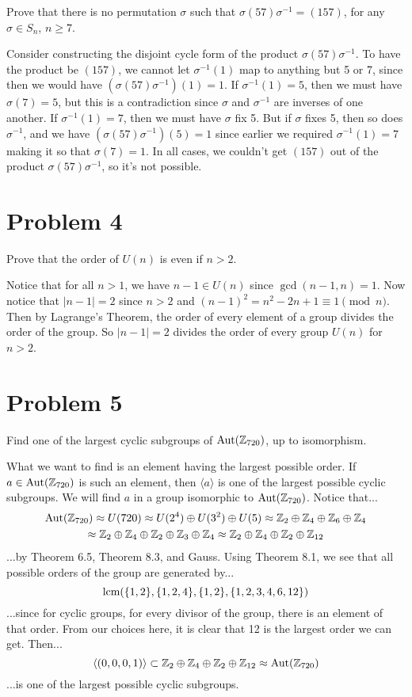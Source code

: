 \documentclass{article}
\begin{document}
Prove that there is no permutation $\sigma$ such that
$\sigma(57)\sigma^{-1}=(157)$, for any $\sigma\in S_n$, $n\geq 7$.

Consider constructing the disjoint cycle form of the product $\sigma(57)\sigma^{-1}$.
To have the product be $(157)$, we cannot let $\sigma^{-1}(1)$ map to anything but
5 or 7, since then we would have $(\sigma(57)\sigma^{-1})(1)=1$.  If $\sigma^{-1}(1)=5$,
then we must have $\sigma(7)=5$, but this is a contradiction since $\sigma$ and
$\sigma^{-1}$ are inverses of one another.  If $\sigma^{-1}(1)=7$, then we
must have $\sigma$ fix 5.  But if $\sigma$ fixes 5, then so does $\sigma^{-1}$,
and we have $(\sigma(57)\sigma^{-1})(5)=1$ since earlier we required $\sigma^{-1}(1)=7$
making it so that $\sigma(7)=1$.  In all cases, we couldn't get $(157)$ out of the
product $\sigma(57)\sigma^{-1}$, so it's not possible.

\section*{Problem 4}

Prove that the order of $U(n)$ is even if $n>2$.

Notice that for all $n>1$, we have $n-1\in U(n)$ since $\gcd(n-1,n)=1$.
Now notice that $|n-1|=2$ since $n>2$ and $(n-1)^2=n^2-2n+1\equiv 1\pmod{n}$.
Then by Lagrange's Theorem, the order of every element of a group divides
the order of the group.  So $|n-1|=2$ divides the order of every group $U(n)$ for $n>2$.

\pagebreak
\section*{Problem 5}

Find one of the largest cyclic subgroups of $\mbox{Aut}(\mathbb{Z}_{720})$, up to isomorphism.

What we want to find is an element having the largest possible order.
If $a\in\mbox{Aut}(\mathbb{Z}_{720})$ is such an element, then $\langle a\rangle$
is one of the largest possible cyclic subgroups.  We will find $a$ in a group
isomorphic to $\mbox{Aut}(\mathbb{Z}_{720})$.  Notice that...
\begin{multline*}
\mbox{Aut}(\mathbb{Z}_{720})\approx U(720)\approx U(2^4)\oplus U(3^2)\oplus U(5)\approx
\mathbb{Z}_2\oplus\mathbb{Z}_4\oplus\mathbb{Z}_6\oplus\mathbb{Z}_4 \\
\approx\mathbb{Z}_2\oplus\mathbb{Z}_4\oplus\mathbb{Z}_2\oplus\mathbb{Z}_3\oplus\mathbb{Z}_4
\approx\mathbb{Z}_2\oplus\mathbb{Z}_4\oplus\mathbb{Z}_2\oplus\mathbb{Z}_{12}
\end{multline*}
...by Theorem 6.5, Theorem 8.3, and Gauss.  Using Theorem 8.1, we see
that all possible orders of the group are generated by...
\begin{equation*}
\mbox{lcm}(\{1,2\},\{1,2,4\},\{1,2\},\{1,2,3,4,6,12\})
\end{equation*}
...since for cyclic groups, for every divisor of the group, there is an
element of that order.  From our choices here, it is clear that 12 is
the largest order we can get.  Then...
\begin{equation*}
\langle(0,0,0,1)\rangle\subset\mathbb{Z}_2\oplus\mathbb{Z}_4\oplus\mathbb{Z}_2\oplus\mathbb{Z}_{12}\approx\mbox{Aut}(\mathbb{Z}_{720})
\end{equation*}
...is one of the largest possible cyclic subgroups.
\end{document}
